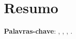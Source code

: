 
\newenvironment{reumo}{%
}{%
}

\section*{Resumo}


\vspace{2cm}

\noindent\textbf{Palavras-chave}: \PCUM, \PCDOIS, \PCTRES, \PCQUATRO.
